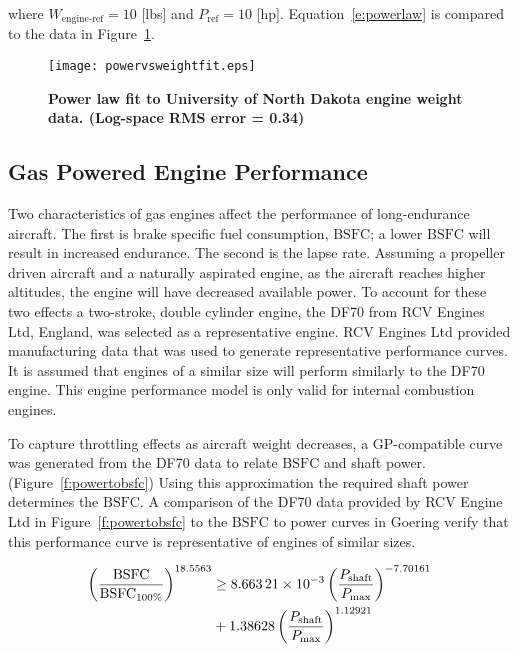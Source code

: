 where $W_{\text{engine-ref}} = 10$ [lbs] and $P_{\text{ref}} = 10$ [hp].   
Equation~\eqref{e:powerlaw} is compared to the data in Figure~\ref{f:powervsweightfit}.

\begin{figure}[h!]
	\begin{center}
	\texttt{[image: powervsweightfit.eps]}
    \caption{\textbf{Power law fit to University of North Dakota engine weight data\cite{gasengine}. (Log-space RMS error = 0.34)}}
	\label{f:powervsweightfit}
	\end{center}
\end{figure}

\subsection{Gas Powered Engine Performance}

Two characteristics of gas engines affect the performance of long-endurance aircraft.  
The first is brake specific fuel consumption, $\text{BSFC}$; a lower $\text{BSFC}$ will result in increased endurance.  
The second is the lapse rate.  
Assuming a propeller driven aircraft and a naturally aspirated engine, as the aircraft reaches higher altitudes, the engine will have decreased available power. 
To account for these two effects a two-stroke, double cylinder engine, the DF70 from RCV Engines Ltd, England, was selected as a representative engine.  
RCV Engines Ltd provided manufacturing data that was used to generate representative performance curves.\cite{rcvengines}
It is assumed that engines of a similar size will perform similarly to the DF70 engine.  
This engine performance model is only valid for internal combustion engines.

To capture throttling effects as aircraft weight decreases, a GP-compatible curve was generated from the DF70 data to relate $\text{BSFC}$ and shaft power. (Figure~\ref{f:powertobsfc})
Using this approximation the required shaft power determines the $\text{BSFC}$.
A comparison of the DF70 data provided by RCV Engine Ltd in Figure~\ref{f:powertobsfc} to the $\text{BSFC}$ to power curves in Goering\cite{bsfcperf} verify that this performance curve is representative of engines of similar sizes. 

\begin{align}
    \label{e:rpmtobsfc}
    \left( \frac{\text{BSFC}}{\text{BSFC}_{100\%}} \right)^{18.5563} &\geq \num{8.66321d-3}\left( \frac{P_{\text{shaft}}}{P_{\text{max}}}\right)^{-7.70161} \nonumber \\
                &+ 1.38628\left( \frac{P_{\text{shaft}}}{P_{\text{max}}} \right)^{1.12921} 
\end{align}

